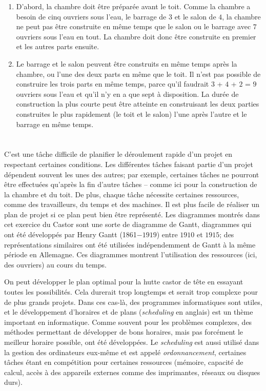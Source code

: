 {{\begin{enumerate}
  \item D’abord, la chambre doit être préparée avant le toit. Comme la chambre a besoin de cinq ouvriers sous l’eau, le barrage de $3$ et le salon de $4$, la chambre ne peut pas être construite en même temps que le salon ou le barrage avec $7$ ouvriers sous l’eau en tout. La chambre doit donc être construite en premier et les autres parts ensuite.
  \item Le barrage et le salon peuvent être construits en même temps après la chambre, ou l’une des deux parts en même que le toit. Il n’est pas possible de construire les trois parts en même temps, parce qu’il faudrait $3$ + $4$ + $2$ = $9$ ouvriers sous l’eau et qu’il n’y en a que sept à disposition. La durée de construction la plus courte peut être atteinte en construisant les deux parties construites le plus rapidement (le toit et le salon) l’une après l’autre et le barrage en même temps.
\end{enumerate}



\section*{\BrochureItsInformatics}
C’est une tâche difficile de planifier le déroulement rapide d’un projet en respectant certaines conditions. Les différentes tâches faisant partie d’un projet dépendent souvent les unes des autres; par exemple, certaines tâches ne pourront être effectuées qu’après la fin d’autre tâches – comme ici pour la construction de la chambre et du toit. De plus, chaque tâche nécessite certaines ressources, comme des travailleurs, du temps et des machines. Il est plus facile de réaliser un plan de projet si ce plan peut bien être représenté. Les diagrammes montrés dans cet exercice du Castor sont une sorte de diagramme de Gantt, diagrammes qui ont été développés par Henry Gantt (1861$-1919$) entre $1910$ et $1915$; des représentations similaires ont été utilisées indépendemment de Gantt à la même période en Allemagne. Ces diagrammes montrent l’utilisation des ressources (ici, des ouvriers) au cours du temps.

On peut développer le plan optimal pour la hutte castor de tête en essayant toutes les possibilités. Cela durerait trop longtemps et serait trop complexe pour de plus grands projets. Dans ces cas-là, des programmes informatiques sont utiles, et le développement d’horaires et de plans (\emph{scheduling} en anglais) est un thème important en informatique. Comme souvent pour les problèmes complexes, des méthodes permettant de développer de bons horaires, mais pas forcément le meilleur horaire possible, ont été développées. Le \emph{scheduling} est aussi utilisé dans la gestion des ordinateurs eux-même et est appelé \emph{ordonnancement}, certaines tâches étant en compétition pour certaines ressources (mémoire, capacité de calcul, accès à des appareils externes comme des imprimantes, réseaux ou disques durs).



}}
